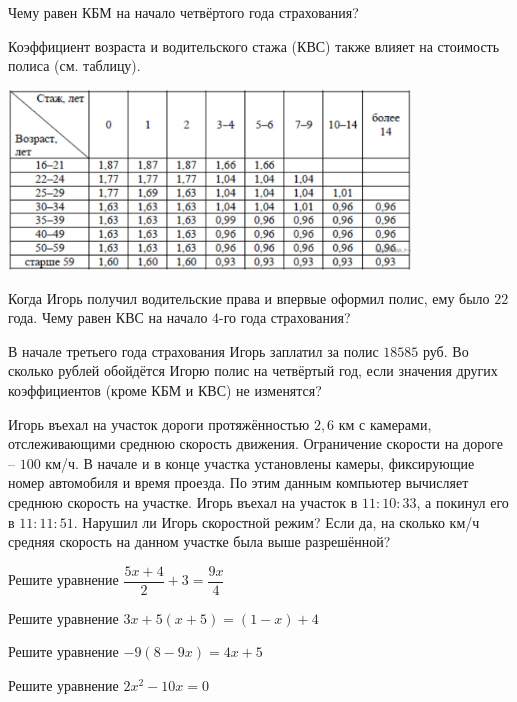 \begin{homework}[number=2]
\begin{listofex}
	\item Чему равен КБМ на начало четвёртого года страхования?
	\item Коэффициент возраста и водительского стажа (КВС) также влияет на стоимость полиса (см. таблицу).
	\begin{center}
		\includegraphics[align=t, width=0.8\textwidth]{pics/G91M3H2-2}
	\end{center}
		Когда Игорь получил водительские права и впервые оформил полис, ему было \( 22 \) года. Чему равен КВС на начало \( 4 \)-го года страхования?
	\item В начале третьего года страхования Игорь заплатил за полис \( 18 585 \) руб. Во сколько рублей обойдётся Игорю полис на четвёртый год, если значения других коэффициентов (кроме КБМ и КВС) не изменятся?	
	\item Игорь въехал на участок дороги протяжённостью \( 2,6 \) км с камерами, отслеживающими среднюю скорость движения. Ограничение скорости на дороге -- \( 100  \) км/ч. В начале и в конце участка установлены камеры, фиксирующие номер автомобиля и время проезда. По этим данным компьютер вычисляет среднюю скорость на участке. Игорь въехал на участок в \( 11:10:33 \), а покинул его в \( 11:11:51 \). Нарушил ли Игорь скоростной режим? Если да, на сколько км/ч средняя скорость на данном участке была выше разрешённой?
	\item Решите уравнение \( \dfrac{5x+4}{2}+3=\dfrac{9x}{4} \)
	\item Решите уравнение \( 3x+5(x+5)=(1-x)+4 \)
	\item Решите уравнение \( -9(8-9x)=4x+5 \)
	\item Решите уравнение \( 2x^2-10x=0 \)
	\item {}
	\end{listofex}
\end{homework}
